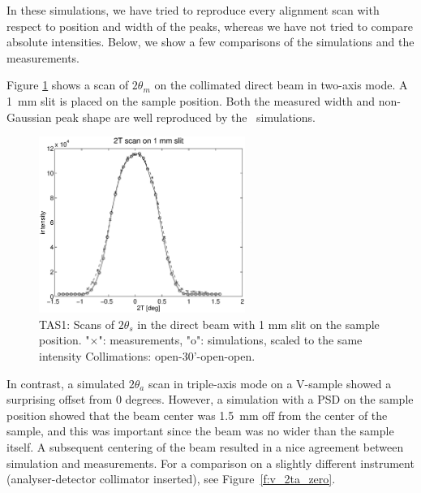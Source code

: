 In these simulations, we have tried to reproduce
every alignment scan with respect to position and width
of the peaks, whereas we have not tried to compare
absolute intensities. Below, we show a few comparisons
of the simulations and the measurements.

Figure \ref{f:2t_direct} shows a scan of
$2\theta_m$ on the collimated direct beam in two-axis mode.
A \hbox{1 mm} slit is placed on the sample position.
Both the measured width and non-Gaussian peak shape
are well reproduced by the \MCS\ simulations.

\begin{figure}
  \begin{center}
    \includegraphics[width=0.6\textwidth]{figures/tas1-2T.eps}
  \end{center}
\caption{TAS1: Scans of $2\theta_s$ in the direct beam with 1 mm slit on the
  sample position.
"$\times$": measurements, "o": simulations, scaled to the same intensity
Collimations: open-30'-open-open.}
\label{f:2t_direct}
\end{figure}

In contrast, a simulated $2\theta_a$ scan in triple-axis
mode on a V-sample showed a surprising offset from 0 degrees.
However, a simulation with a PSD
on the sample position showed that the beam center was 1.5~mm
off from the center of the sample, and this was important
since the beam was no wider than the sample itself.
A subsequent centering of the beam resulted in a nice
agreement between simulation and measurements.
For a comparison on a slightly different instrument
(analyser-detector collimator inserted),
see Figure~\ref{f:v_2ta_zero}.


